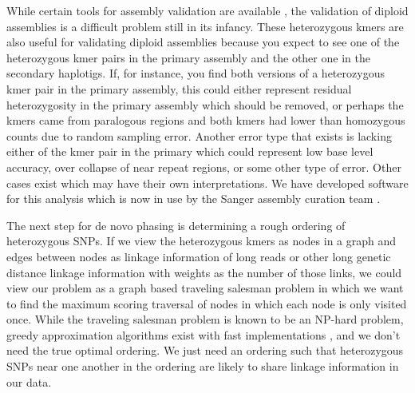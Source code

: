 While certain tools for assembly validation are available \cite{KAT} \cite{busco}, the validation of diploid assemblies is a difficult problem still in its infancy. 
These heterozygous kmers are also useful for validating diploid assemblies because you expect to see one of the heterozygous kmer pairs in the primary assembly 
and the other one in the secondary haplotigs. If, for instance, you find both versions of a heterozygous kmer pair in the primary assembly, this could either represent residual 
heterozygosity in the primary assembly which should be removed, or perhaps the kmers came from paralogous regions and both kmers had lower than homozygous counts 
due to random sampling error. Another error type that exists is lacking either of the kmer pair in the primary which could represent low base level accuracy, over collapse of near repeat regions, or some other type of error. Other cases exist which may have their own interpretations. We have developed software for this analysis which is now in use by the Sanger 
assembly curation team \cite{haplovalidate}.

The next step for de novo phasing is determining a rough ordering of heterozygous SNPs. If we view the heterozygous kmers as nodes in a graph and edges between 
nodes as linkage information of long reads or other long genetic distance linkage information with weights as the number of those links, we could view our problem as a 
graph based traveling salesman problem in which we want to find the maximum scoring traversal of nodes in which each node is only visited once. While the traveling salesman 
problem is known to be an NP-hard problem, greedy approximation algorithms exist with fast implementations \cite{randomwalkTSP}, and we don't need the true optimal ordering. 
We just need an ordering such that heterozygous SNPs near one another in the ordering are likely to share linkage information in our data.


